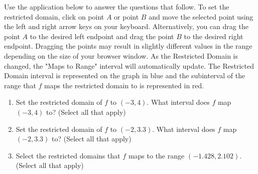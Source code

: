 \documentclass{ximera}
\author{Kevin James}
\begin{document}
   \begin{exercise}
   	  Use the application below to answer the questions that follow.  To set the restricted domain, click on point $ A $ or point $ B $ and move the selected point using the left and right arrow keys on your keyboard.  Alternatively, you can drag the point $ A $ to the desired left endpoint and drag the point $ B $ to the desired right endpoint.  Dragging the points may result in slightly different values in the range depending on the size of your browser window.  As the Restricted Domain is changed, the "Maps to Range" interval will automatically update.  The Restricted Domain interval is represented on the graph in blue and the subinterval of the range that $ f $ maps the restricted domain to is represented in red.
   	  \begin{center}
   	  	\begin{onlineOnly}
   	    \end{onlineOnly} 
     \end{center}
 	 \begin{enumerate}
 	 	\item Set the restricted domain of $ f $ to $ (-3, 4) $.  What interval does $ f $ map $ (-3, 4) $ to?  (Select all that apply)
   	       \begin{multipleChoice}
   	       \end{multipleChoice}
        \item Set the restricted domain of $ f $ to $ (-2, 3.3) $.  What interval does $ f $ map $ (-2,3.3) $ to?  (Select all that apply)
           \begin{selectAll}
          \end{selectAll}
        \item Select the restricted domains that $ f $ maps to the range $ (-1.428, 2.102) $.  (Select all that apply)
          \begin{selectAll}

\end{selectAll}
\end{enumerate}
\end{exercise}
\end{document}
